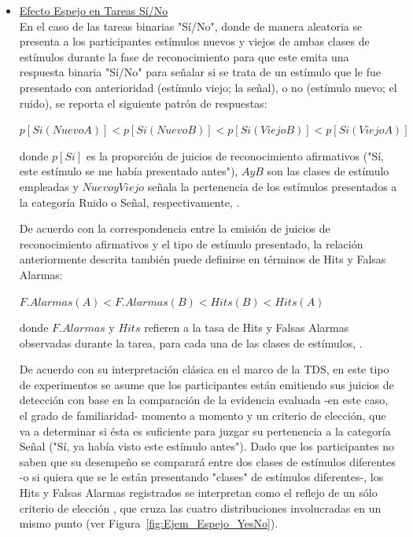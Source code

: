 \begin{itemize}
\item \underline{Efecto Espejo en Tareas Sí/No}\\

En el caso de las tareas binarias "Sí/No", donde de manera aleatoria se presenta a los participantes estímulos nuevos y viejos de ambas clases de estímulos durante la fase de reconocimiento para que este emita una respuesta binaria "Sí/No" para señalar si se trata de un estímulo que le fue presentado con anterioridad (estímulo viejo; la señal), o no (estímulo nuevo; el ruido), se reporta el siguiente patrón de respuestas:\\

\begin{center}
$p[Si(NuevoA)] < p[Si(NuevoB)] < p[Si(ViejoB)] < p[Si(ViejoA)]$\\
\end{center}
\begin{center}
donde $p[Si]$ es la proporción de juicios de reconocimiento afirmativos ("Sí, este estímulo se me había presentado antes"), $A y B$ son las clases de estímulo empleadas y $Nuevo y Viejo$ señala la pertenencia de los estímulos presentados a la categoría Ruido o Señal, respectivamente, \parencite{Glanzer1993}.\\
\end{center}

De acuerdo con la correspondencia entre la emisión de juicios de reconocimiento afirmativos y el tipo de estímulo presentado, la relación anteriormente descrita también puede definirse en términos de Hits y Falsas Alarmas:\\

\begin{center}
$F.Alarmas(A) < F.Alarmas(B) < Hits(B) < Hits(A)$\\
\end{center}
\begin{center}
donde $F.Alarmas$ y $Hits$ refieren a la tasa de Hits y Falsas Alarmas observadas durante la tarea, para cada una de las clases de estímulos, \parencite{Glanzer1993}.\\
\end{center}

De acuerdo con su interpretación clásica en el marco de la TDS, en este tipo de experimentos se asume que los participantes están emitiendo sus juicios de detección con base en la comparación de la evidencia evaluada -en este caso, el grado de familiaridad- momento a momento y un criterio de elección, que va a determinar si ésta es suficiente para juzgar su pertenencia a la categoría Señal ("Sí, ya había visto este estímulo antes"). Dado que los participantes no saben que su desempeño se comparará entre dos clases de estímulos diferentes -o si quiera que se le están presentando "clases" de estímulos diferentes-, los Hits y Falsas Alarmas registrados se interpretan como el reflejo de un sólo criterio de elección \parencite{Glanzer1993}, que cruza las cuatro distribuciones involucradas en un mismo punto (ver Figura~\ref{fig:Ejem_Espejo_YesNo}).\\


\end{itemize}
